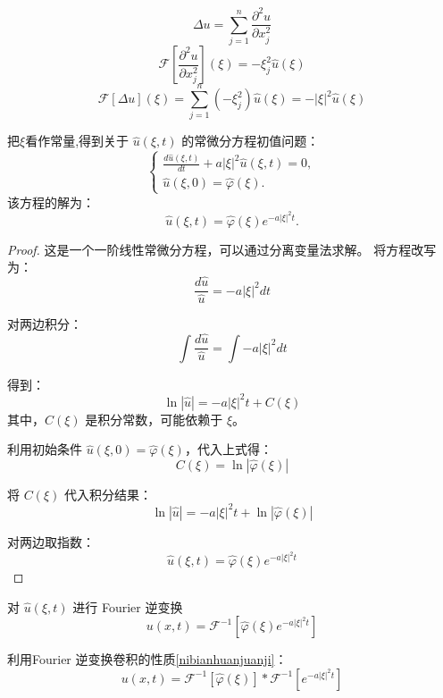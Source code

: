 \documentclass[12pt,a4paper]{article}
\numberwithin{subsection}{section}
\numberwithin{subsubsection}{subsection}
\theoremstyle{plain}
\theoremstyle{definition}
\theoremstyle{remark}
\begin{document}
	\[
	\Delta u = \sum_{j=1}^n \frac{\partial^2 u}{\partial x_j^2}
	\]
	\[
	\mathcal{F}\left[\frac{\partial^2 u}{\partial x_j^2}\right](\xi) = -\xi_j^2 \hat{u}(\xi)
	\]
	\begin{equation}
		\mathcal{F}[\Delta u](\xi) = \sum_{j=1}^n (-\xi_j^2) \hat{u}(\xi) = -|\xi|^2 \hat{u}(\xi)
	\end{equation}
	
	
	把$\xi$看作常量,得到关于 \(\hat{u}(\xi, t)\) 的常微分方程初值问题：
	\begin{equation}
		\begin{cases}
			\displaystyle \frac{d\hat{u}(\xi, t)}{dt} + a|\xi|^2 \hat{u}(\xi, t) = 0, \\
			\hat{u}(\xi, 0) = \hat{\varphi}(\xi).
		\end{cases}
	\end{equation}
	该方程的解为：
	\begin{equation}
		\hat{u}(\xi, t) = \hat{\varphi}(\xi) e^{-a|\xi|^2 t}.
	\end{equation}
	
	
	
	\begin{proof}
		这是一个一阶线性常微分方程，可以通过分离变量法求解。
		将方程改写为：
		\[
		\frac{d\hat{u}}{\hat{u}} = -a |\xi|^2 dt
		\]
		
		对两边积分：
		\[
		\int \frac{d\hat{u}}{\hat{u}} = \int -a |\xi|^2 dt
		\]
		
		得到：
		\[
		\ln|\hat{u}| = -a |\xi|^2 t + C(\xi)
		\]
		其中，\(C(\xi)\) 是积分常数，可能依赖于 \(\xi\)。
		
		
		利用初始条件 \(\hat{u}(\xi, 0) = \hat{\varphi}(\xi)\)，代入上式得：
		\[
		C(\xi) = \ln|\hat{\varphi}(\xi)|
		\]
		
		将 \(C(\xi)\) 代入积分结果：
		\[
		\ln|\hat{u}| = -a |\xi|^2 t + \ln|\hat{\varphi}(\xi)|
		\]
		
		对两边取指数：
		\[
		\hat{u}(\xi, t) = \hat{\varphi}(\xi) e^{-a |\xi|^2 t}
		\]
		
		
	\end{proof}
	
	
	对 \(\hat{u}(\xi, t)\) 进行 Fourier 逆变换
	\begin{equation}
		u(x, t) = \mathcal{F}^{-1}[\hat{\varphi}(\xi) e^{-a|\xi|^2 t}]
	\end{equation}
	
	利用Fourier 逆变换卷积的性质\eqref{nibianhuanjuanji}：
	\begin{equation}
		u(x, t) = \mathcal{F}^{-1}[\hat{\varphi}(\xi)] * \mathcal{F}^{-1}[e^{-a|\xi|^2 t}]
	\end{equation}
	
\end{document}
